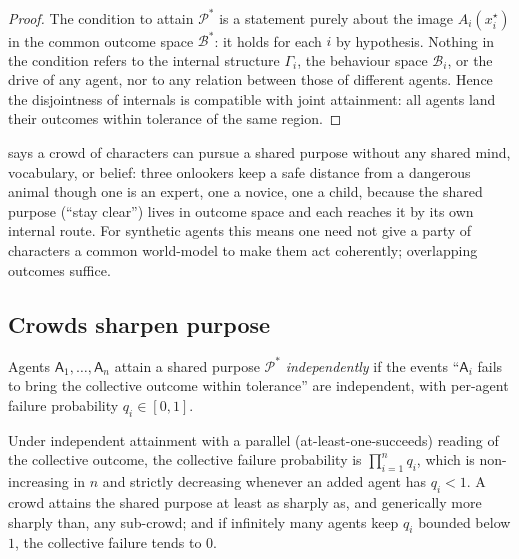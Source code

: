 \documentclass[11pt,twocolumn,a4paper]{article}
\newcommand{\Agent}{\mathsf{A}}
\newcommand{\Self}{\Gamma}          %
\newcommand{\Beh}{\mathcal{B}}       %
\newcommand{\Purp}{\mathcal{P}}      %
\begin{document}
\begin{proof}
The condition to attain $\Purp^\ast$ is a statement purely about the image
$A_i(x^\star_i)$ in the common outcome space $\Beh^\ast$: it holds for
each $i$ by hypothesis. Nothing in the condition refers to the internal
structure $\Self_i$, the behaviour space $\Beh_i$, or the drive of any
agent, nor to any relation between those of different agents. Hence the
disjointness of internals is compatible with joint attainment: all agents
land their outcomes within tolerance of the same region.
\end{proof}

\begin{remark}
 says a crowd of characters can pursue a shared purpose
without any shared mind, vocabulary, or belief: three onlookers keep a
safe distance from a dangerous animal though one is an expert, one a
novice, one a child, because the shared purpose (``stay clear'') lives in
outcome space and each reaches it by its own internal route. For synthetic
agents this means one need not give a party of characters a common
world-model to make them act coherently; overlapping outcomes suffice.
\end{remark}

\subsection{Crowds sharpen purpose}

\begin{definition}
\label{def:indep}
Agents $\Agent_1,\dots,\Agent_n$ attain a shared purpose $\Purp^\ast$
\emph{independently} if the events ``$\Agent_i$ fails to bring the
collective outcome within tolerance'' are independent, with per-agent
failure probability $q_i\in[0,1]$.
\end{definition}

\begin{theorem}
\label{thm:crowd}
Under independent attainment with a parallel (at-least-one-succeeds)
reading of the collective outcome, the collective failure probability is
$\prod_{i=1}^n q_i$, which is non-increasing in $n$ and strictly
decreasing whenever an added agent has $q_i<1$. A crowd attains the shared
purpose at least as sharply as, and generically more sharply than, any
sub-crowd; and if infinitely many agents keep $q_i$ bounded below $1$, the
collective failure tends to $0$.
\end{theorem}
\end{document}
